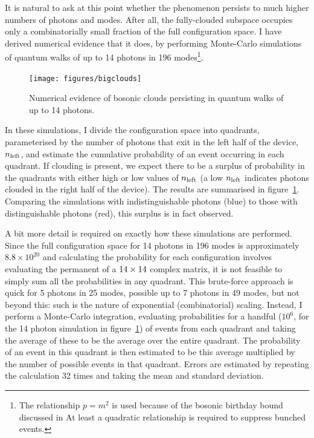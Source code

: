 It is natural to ask at this point whether the phenomenon persists to much
higher numbers of photons and modes. After all, the fully-clouded subspace
occupies only a combinatorially small fraction of the full configuration space.
I have derived numerical evidence that it does, by performing
Monte-Carlo simulations of quantum walks of up to 14 photons in 196
modes\footnote{The relationship \(p=m^{2}\) is used because of the bosonic
birthday bound discussed in \cite{bosonsampling, birthdays,
experimental-birthdays} At least a quadratic relationship is required to
suppress bunched events.}.

\begin{figure}[h]
  \centering
  \texttt{[image: figures/bigclouds]}
  \caption[Numerical evidence of bosonic clouds in 14-photon quantum walks]
  {Numerical evidence of bosonic clouds persisting in quantum walks of up to 14
  photons.}
  \label{fig:bigclouds}
\end{figure}
In these simulations, I divide the configuration space into quadrants,
parameterised by the number of photons that exit in the left half of the device,
\(n_{\text{left}}\), and estimate the cumulative probability of an event occurring in
each quadrant. If clouding is present, we expect there to be a surplus of
probability in the quadrants with either high or low values of \(n_{\text{left}}\) (a low
\(n_{\text{left}}\) indicates photons clouded in the right half of the device). The
results are summarised in figure~\ref{fig:bigclouds}. Comparing the simulations
with indistinguishable photons (blue) to those with distinguishable photons
(red), this surplus is in fact observed.

A bit more detail is required on exactly how these simulations are performed. 
Since the full configuration space for 14 photons in 196 modes is approximately
\(8.8 \times 10^{20}\) and calculating the probability for each configuration
involves evaluating the permanent of a \(14 \times 14\) complex matrix, it is not
feasible to simply sum all the probabilities in any quadrant. This brute-force
approach is quick for 5 photons in 25 modes, possible up to 7 photons in 49
modes, but not beyond this: such is the nature of exponential (combinatorial)
scaling. Instead, I perform a Monte-Carlo integration, evaluating probabilities
for a handful (\(10^{6}\), for the 14 photon simulation in
figure~\ref{fig:bigclouds}) of events from each quadrant and taking the average
of these to be the average over the entire quadrant. The probability of an event
in this quadrant is then estimated to be this average multiplied by the number
of possible events in that quadrant. Errors are estimated by repeating the
calculation 32 times and taking the mean and standard deviation.

